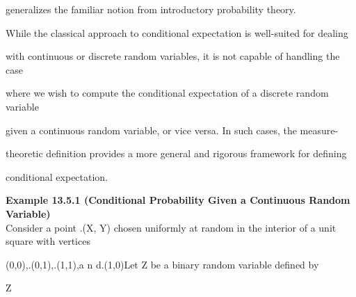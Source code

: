 generalizes the familiar notion from introductory probability theory.

While the classical approach to conditional expectation is well-suited for dealing

with continuous or discrete random variables, it is not capable of handling the case

where we wish to compute the conditional expectation of a discrete random variable

given a continuous random variable, or vice versa. In such cases, the measure-

theoretic definition provides a more general and rigorous framework for defining

conditional expectation.

\textbf{Example 13.5.1 (Conditional Probability Given a Continuous Random Variable)} \\

Consider a point .(X, Y) chosen uniformly at random in the interior of a unit square with vertices

(0,0),.(0,1),.(1,1),a n d.(1,0)Let Z be a binary random variable defined by

Z\coloneqq

